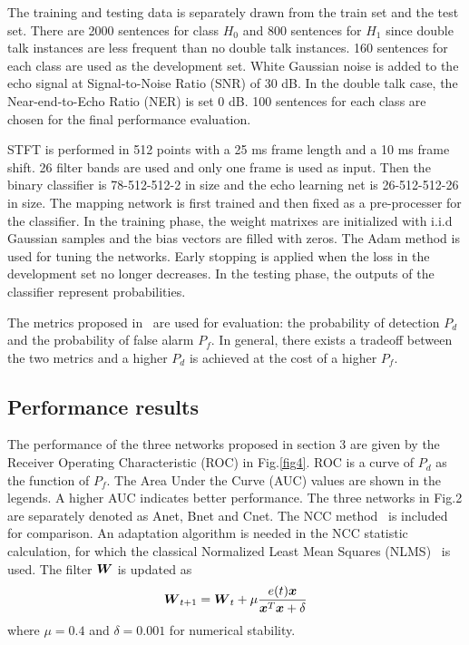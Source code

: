 \documentclass[a4paper]{article}
\begin{document}
The training and testing data is separately drawn from the train set and the test set. There are 2000 sentences for class $H_0$ and 800 sentences for $H_1$ since double talk instances are less frequent than no double talk instances. 160 sentences for each class are used as the development set. White Gaussian noise is added to the echo signal at Signal-to-Noise Ratio (SNR) of 30 dB. In the double talk case, the Near-end-to-Echo Ratio (NER) is set 0 dB. 100 sentences for each class are chosen for the final performance evaluation.

STFT is performed in 512 points with a 25 ms frame length and a 10 ms frame shift. 26 filter bands are used and only one frame is used as input. Then the binary classifier is 78-512-512-2 in size and the echo learning net is 26-512-512-26 in size. The mapping network is first trained and then fixed as a pre-processer for the classifier. In the training phase, the weight matrixes are initialized with i.i.d Gaussian samples and the bias vectors are filled with zeros. The Adam method is used for tuning the networks. Early stopping is applied when the loss in the development set no longer decreases. In the testing phase, the outputs of the classifier represent probabilities.

The metrics proposed in~\cite{cho1999objective} are used for evaluation: the probability of detection $P_d$ and the probability of false alarm $P_f$. In general, there exists a tradeoff between the two metrics and a higher $P_d$ is achieved at the cost of a higher $P_f$.

\subsection{Performance results}

The performance of the three networks proposed in section 3 are given by the Receiver Operating Characteristic (ROC) in Fig.\ref{fig4}. ROC is a curve of $P_d$ as the function of $P_f$. The Area Under the Curve (AUC) values are shown in the legends. A higher AUC indicates better performance. The three networks in Fig.2 are separately denoted as Anet, Bnet and Cnet. The NCC method~\cite{iqbal2007normalized} is included for comparison. An adaptation algorithm is needed in the NCC statistic calculation, for which the classical Normalized Least Mean Squares (NLMS)~\cite{haykin2002adaptive} is used. The filter $\bm{{W}}$ is updated as
\begin{equation}\label{eq:nlms}
  \bm{{W}}_{t+1}=\bm{{W}}_{t}+\mu \frac{e(t)\bm{{x}}}{\bm{{x}}^T\bm{{x}}+\delta}
\end{equation}
where $\mu=0.4$ and $\delta=0.001$ for numerical stability.
\end{document}
